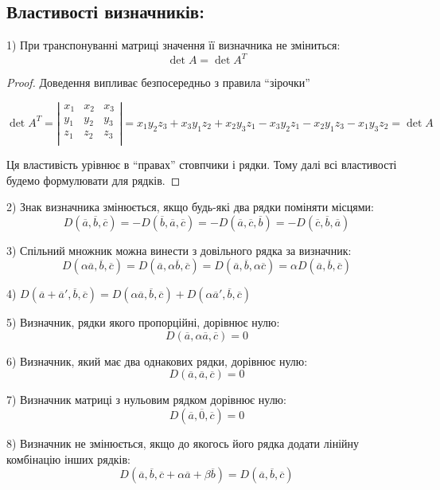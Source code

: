 \subsection*{Властивості визначників:}

1) При транспонуванні матриці значення її визначника не зміниться: 
$$\det A = \det A^T$$
\begin{proof}
	Доведення випливає безпосередньо з правила “зірочки”
	
	$\det A^T = \left|\begin{matrix}
		x_1 & x_2 & x_3 \\
		y_1 & y_2 & y_3 \\
		z_1 & z_2 & z_3 \\
	\end{matrix}\right|
	= x_1y_2z_3 + x_3y_1z_2 + x_2y_3z_1 - x_3y_2z_1 - x_2y_1z_3 - x_1y_3z_2 = \det A$

	Ця властивість урівнює в “правах” стовпчики і рядки. Тому далі всі властивості будемо формулювати для рядків.
\end{proof}

2) Знак визначника змінюється, якщо будь-які два рядки поміняти місцями:
$$D(\overline{a}, \overline{b}, \overline{c}) = -D(\overline{b}, \overline{a}, \overline{c}) = -D(\overline{a}, \overline{c}, \overline{b}) = -D(\overline{c}, \overline{b}, \overline{a})$$

3) Спільний множник можна винести з довільного рядка за визначник:
$$D(\alpha\overline{a}, \overline{b}, \overline{c}) = D(\overline{a}, \alpha\overline{b}, \overline{c}) = D(\overline{a}, \overline{b}, \alpha\overline{c}) = \alpha D(\overline{a}, \overline{b}, \overline{c})$$

4) $D(\overline{a} + \overline{a}', \overline{b}, \overline{c}) = D(\alpha\overline{a}, \overline{b}, \overline{c}) + D(\alpha\overline{a}', \overline{b}, \overline{c})$

5) Визначник, рядки якого пропорційні, дорівнює нулю: 
$$D(\overline{a}, \alpha\overline{a}, \overline{c}) = 0$$

6) Визначник, який має два однакових рядки, дорівнює нулю: 
$$D(\overline{a}, \overline{a}, \overline{c}) = 0$$
	
7) Визначник матриці з нульовим рядком дорівнює нулю: 
$$D(\overline{a}, \overline{0}, \overline{c}) = 0$$	
	
8) Визначник не змінюється, якщо до якогось його рядка додати лінійну
комбінацію інших рядків:
$$D(\overline{a}, \overline{b}, \overline{c} + \alpha\overline{a} + \beta\overline{b})
= D(\overline{a}, \overline{b}, \overline{c})$$
	

